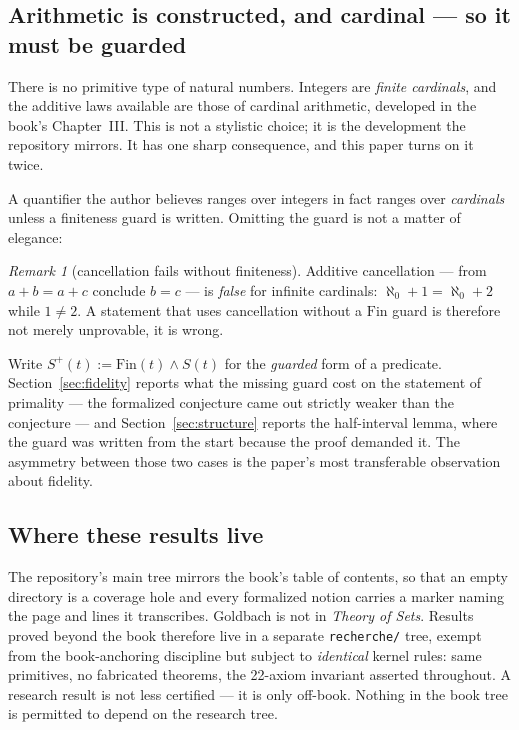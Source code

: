 \documentclass[11pt]{article}
\theoremstyle{remark}\newtheorem{remark}{Remark}
\begin{document}
\subsection{Arithmetic is constructed, and cardinal --- so it must be guarded}

There is no primitive type of natural numbers. Integers are \emph{finite cardinals},
and the additive laws available are those of cardinal arithmetic, developed in the
book's Chapter~III. This is not a stylistic choice; it is the development the
repository mirrors. It has one sharp consequence, and this paper turns on it twice.

A quantifier the author believes ranges over integers in fact ranges over
\emph{cardinals} unless a finiteness guard is written. Omitting the guard is not a
matter of elegance:

\begin{remark}[cancellation fails without finiteness]\label{rem:cancel}
Additive cancellation --- from $a + b = a + c$ conclude $b = c$ --- is \emph{false} for
infinite cardinals: $\aleph_0 + 1 = \aleph_0 + 2$ while $1 \neq 2$. A statement that
uses cancellation without a $\mathrm{Fin}$ guard is therefore not merely unprovable,
it is wrong.
\end{remark}

Write $S^{+}(t) := \mathrm{Fin}(t) \wedge S(t)$ for the \emph{guarded} form of a
predicate. Section~\ref{sec:fidelity} reports what the missing guard cost on the
statement of primality --- the formalized conjecture came out strictly weaker than the
conjecture --- and Section~\ref{sec:structure} reports the half-interval lemma, where
the guard was written from the start because the proof demanded it. The asymmetry
between those two cases is the paper's most transferable observation about fidelity.

\subsection{Where these results live}

The repository's main tree mirrors the book's table of contents, so that an empty
directory is a coverage hole and every formalized notion carries a marker naming the
page and lines it transcribes. Goldbach is not in \emph{Theory of Sets}. Results proved
beyond the book therefore live in a separate \texttt{recherche/} tree, exempt from the
book-anchoring discipline but subject to \emph{identical} kernel rules: same
primitives, no fabricated theorems, the 22-axiom invariant asserted throughout. A
research result is not less certified --- it is only off-book. Nothing in the book tree
is permitted to depend on the research tree.
\end{document}
